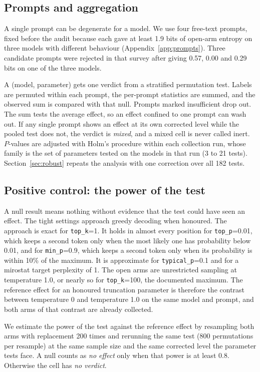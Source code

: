 \documentclass[10pt]{article}
\newcommand{\p}[1]{\texttt{#1}}
\begin{document}
\subsection{Prompts and aggregation}

A single prompt can be degenerate for a model. We use four free-text prompts, fixed before the audit because each gave at least 1.9 bits of open-arm entropy on three models with different behaviour (Appendix~\ref{app:prompts}). Three candidate prompts were rejected in that survey after giving 0.57, 0.00 and 0.29 bits on one of the three models.

A (model, parameter) gets one verdict from a stratified permutation test. Labels are permuted within each prompt, the per-prompt statistics are summed, and the observed sum is compared with that null. Prompts marked insufficient drop out. The sum tests the average effect, so an effect confined to one prompt can wash out. If any single prompt shows an effect at its own corrected level while the pooled test does not, the verdict is \emph{mixed}, and a mixed cell is never called inert. $P$-values are adjusted with Holm's procedure \citep{holm1979} within each collection run, whose family is the set of parameters tested on the models in that run (3 to 21 tests). Section~\ref{sec:robust} repeats the analysis with one correction over all 182 tests.

\subsection{Positive control: the power of the test}

A null result means nothing without evidence that the test could have seen an effect. The tight settings approach greedy decoding when honoured. The approach is exact for \p{top\_k}=1. It holds in almost every position for \p{top\_p}=0.01, which keeps a second token only when the most likely one has probability below 0.01, and for \p{min\_p}=0.9, which keeps a second token only when its probability is within 10\% of the maximum. It is approximate for \p{typical\_p}=0.1 and for a mirostat target perplexity of 1. The open arms are unrestricted sampling at temperature 1.0, or nearly so for \p{top\_k}=100, the documented maximum. The reference effect for an honoured truncation parameter is therefore the contrast between temperature 0 and temperature 1.0 on the same model and prompt, and both arms of that contrast are already collected.

We estimate the power of the test against the reference effect by resampling both arms with replacement 200 times and rerunning the same test (800 permutations per resample) at the same sample size and the same corrected level the parameter tests face. A null counts as \emph{no effect} only when that power is at least 0.8. Otherwise the cell has \emph{no verdict}.
\end{document}
